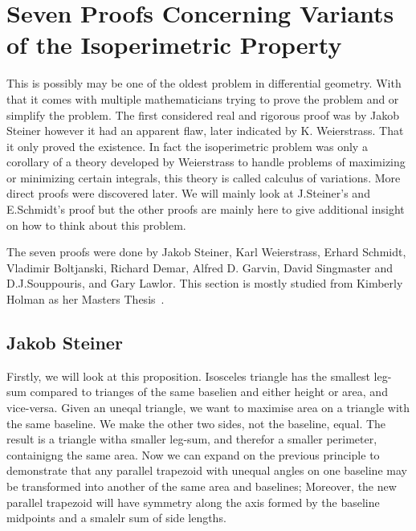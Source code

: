 \documentclass[a4paper]{book}
\begin{document}
\section{Seven Proofs Concerning Variants of the Isoperimetric Property}
This is possibly may be one of the oldest problem in differential geometry. With that it comes with multiple mathematicians trying to prove the problem and or simplify the problem. The first considered real and rigorous proof was by Jakob Steiner however it had an apparent flaw, later indicated by K. Weierstrass. That it only proved the existence. In fact the isoperimetric problem was only a corollary of a theory developed by Weierstrass to handle problems of maximizing or minimizing certain integrals, this theory is called calculus of variations. More direct proofs were discovered later. We will mainly look at J.Steiner's and E.Schmidt's proof but the other proofs are mainly here to give additional insight on how to think about this problem. 

The seven proofs were done by Jakob Steiner, Karl Weierstrass, Erhard Schmidt, Vladimir Boltjanski, Richard Demar, Alfred D. Garvin, David Singmaster and D.J.Souppouris, and Gary Lawlor. This section is mostly studied from Kimberly Holman as her Masters Thesis~\cite{holman2022isoperimetric}.

\subsection{Jakob Steiner}
Firstly, we will look at this proposition. Isosceles triangle has the smallest leg-sum compared to trianges of the same baselien and either height or area, and vice-versa. Given an uneqal triangle, we want to maximise area on a triangle with the same baseline. We make the other two sides, not the baseline, equal. The result is a triangle witha smaller leg-sum, and therefor a smaller perimeter, containigng the same area. Now we can expand on the previous principle to demonstrate that any parallel trapezoid with unequal angles on one baseline may be transformed into another of the same area and baselines; Moreover, the new parallel trapezoid will have symmetry along the axis formed by the baseline midpoints and a smalelr sum of side lengths.
\end{document}
